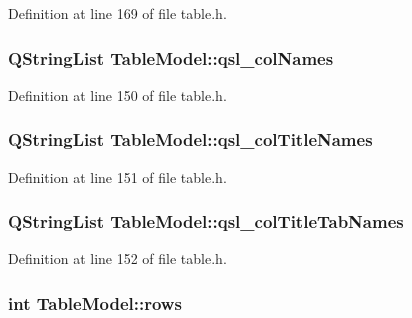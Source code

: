 Definition at line 169 of file table.h.

\hypertarget{classTableModel_af80c02eb0f33a2c10804aae3c35699f8}{
\subsubsection[{qsl\_\-colNames}]{\setlength{\rightskip}{0pt plus 5cm}QStringList {\bf TableModel::qsl\_\-colNames}}}
\label{classTableModel_af80c02eb0f33a2c10804aae3c35699f8}


Definition at line 150 of file table.h.

\hypertarget{classTableModel_a09bb7e46ef71f2a97ea01d73f5e2cb02}{
\subsubsection[{qsl\_\-colTitleNames}]{\setlength{\rightskip}{0pt plus 5cm}QStringList {\bf TableModel::qsl\_\-colTitleNames}}}
\label{classTableModel_a09bb7e46ef71f2a97ea01d73f5e2cb02}


Definition at line 151 of file table.h.

\hypertarget{classTableModel_a96ee46443dfe2b3eae27af6919781450}{
\subsubsection[{qsl\_\-colTitleTabNames}]{\setlength{\rightskip}{0pt plus 5cm}QStringList {\bf TableModel::qsl\_\-colTitleTabNames}}}
\label{classTableModel_a96ee46443dfe2b3eae27af6919781450}


Definition at line 152 of file table.h.

\hypertarget{classTableModel_ab55a02518eefc1d6fc1bcf0ea62be849}{
\subsubsection[{rows}]{\setlength{\rightskip}{0pt plus 5cm}int {\bf TableModel::rows}}}
\label{classTableModel_ab55a02518eefc1d6fc1bcf0ea62be849}


